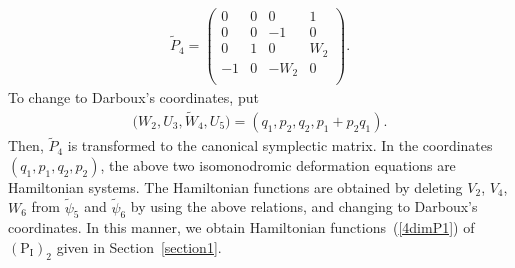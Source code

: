 \documentclass[pdftex]{sigma}
\numberwithin{equation}{section}
\begin{document}
\begin{gather*}
\widetilde{P}_4 = \left(
\begin{matrix}
0 &0 &0 &1 \\
0&0 & -1 & 0 \\
0&1 &0 & W_2 \\
-1&0 &-W_2 &0 \\
\end{matrix}
\right).
\end{gather*}
To change to Darboux's coordinates, put
\begin{gather*}
\big(W_2,U_3,\widetilde{W}_4, U_5\big) = (q_1, p_2, q_2, p_1 + p_2q_1).
\end{gather*}
Then, $\widetilde{P}_4$ is transformed to the canonical symplectic matrix. In the coordinates $(q_1, p_1, q_2, p_2)$, the above two isomonodromic deformation equations are Hamiltonian systems. The Hamiltonian functions are obtained by deleting $V_2$, $V_4$, $W_6$ from $\widetilde{\psi}_5$ and $\widetilde{\psi}_6$ by using the above relations, and changing to Darboux's coordinates. In this manner, we obtain Hamiltonian functions~(\ref{4dimP1}) of~$(\text{P}_\text{I})_2$ given in Section~\ref{section1}.
\end{document}
